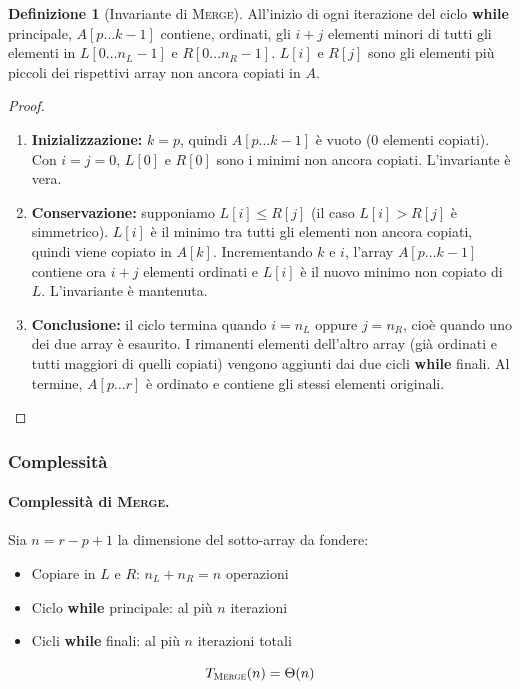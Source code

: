 \documentclass[a4paper, 11pt]{article}
\theoremstyle{definition}
\newtheorem{definizione}{Definizione}[section]
\theoremstyle{remark}
\theoremstyle{remark}
\begin{document}
	\begin{definizione}[Invariante di \textsc{Merge}]
		All'inizio di ogni iterazione del ciclo \textbf{while} principale,
		$A[p \ldots k-1]$ contiene, ordinati, gli $i+j$ elementi minori
		di tutti gli elementi in $L[0 \ldots n_L-1]$ e $R[0 \ldots n_R-1]$.
		$L[i]$ e $R[j]$ sono gli elementi più piccoli dei rispettivi array
		non ancora copiati in $A$.
	\end{definizione}
	
	\begin{proof}
		\begin{enumerate}
			\item \textbf{Inizializzazione:} $k = p$, quindi $A[p \ldots k-1]$
			è vuoto ($0$ elementi copiati). Con $i = j = 0$, $L[0]$ e
			$R[0]$ sono i minimi non ancora copiati. L'invariante è vera. \checkmark
			
			\item \textbf{Conservazione:} supponiamo $L[i] \leq R[j]$ (il caso
			$L[i] > R[j]$ è simmetrico). $L[i]$ è il minimo tra tutti gli
			elementi non ancora copiati, quindi viene copiato in $A[k]$.
			Incrementando $k$ e $i$, l'array $A[p \ldots k-1]$ contiene
			ora $i+j$ elementi ordinati e $L[i]$ è il nuovo minimo
			non copiato di $L$. L'invariante è mantenuta. \checkmark
			
			\item \textbf{Conclusione:} il ciclo termina quando $i = n_L$
			oppure $j = n_R$, cioè quando uno dei due array è esaurito.
			I rimanenti elementi dell'altro array (già ordinati e tutti
			maggiori di quelli copiati) vengono aggiunti dai due cicli
			\textbf{while} finali. Al termine, $A[p \ldots r]$ è ordinato
			e contiene gli stessi elementi originali. \checkmark
		\end{enumerate}
	\end{proof}
	
	\subsubsection{Complessità}
	
	\paragraph{Complessità di \textsc{Merge}.}
	
	Sia $n = r - p + 1$ la dimensione del sotto-array da fondere:
	\begin{itemize}
		\item Copiare in $L$ e $R$: $n_L + n_R = n$ operazioni
		\item Ciclo \textbf{while} principale: al più $n$ iterazioni
		\item Cicli \textbf{while} finali: al più $n$ iterazioni totali
	\end{itemize}
	\[
	T_{\textsc{Merge}}(n) = \Theta(n)
	\]
	
\end{document}
